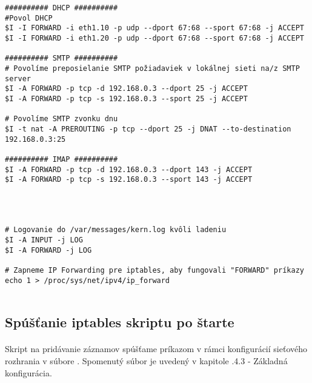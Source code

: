 {\begin{small}
\begin{verbatim}
########## DHCP ##########
#Povol DHCP
$I -I FORWARD -i eth1.10 -p udp --dport 67:68 --sport 67:68 -j ACCEPT
$I -I FORWARD -i eth1.20 -p udp --dport 67:68 --sport 67:68 -j ACCEPT

########## SMTP ##########
# Povolíme preposielanie SMTP požiadaviek v lokálnej sieti na/z SMTP server
$I -A FORWARD -p tcp -d 192.168.0.3 --dport 25 -j ACCEPT
$I -A FORWARD -p tcp -s 192.168.0.3 --sport 25 -j ACCEPT

# Povolíme SMTP zvonku dnu
$I -t nat -A PREROUTING -p tcp --dport 25 -j DNAT --to-destination 192.168.0.3:25

########## IMAP ##########
$I -A FORWARD -p tcp -d 192.168.0.3 --dport 143 -j ACCEPT
$I -A FORWARD -p tcp -s 192.168.0.3 --sport 143 -j ACCEPT




# Logovanie do /var/messages/kern.log kvôli ladeniu
$I -A INPUT -j LOG
$I -A FORWARD -j LOG

# Zapneme IP Forwarding pre iptables, aby fungovali "FORWARD" príkazy
echo 1 > /proc/sys/net/ipv4/ip_forward


\end{verbatim}

\end{small}

}

\subsection{Spúšťanie iptables skriptu po štarte}
\paragraph{}
Skript na pridávanie záznamov  spúšťame príkazom  v rámci konfigurácií sieťového rozhrania  v súbore . Spomenutý súbor je uvedený v kapitole \say.{4.3 - Základná konfigurácia}.